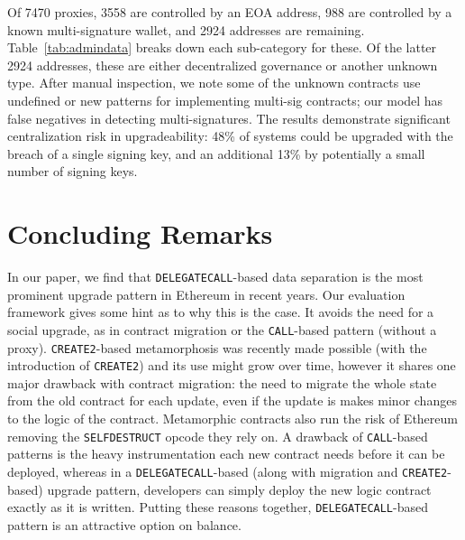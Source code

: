 Of 7470 proxies, 3558 are controlled by an EOA address, 988 are controlled by a known multi-signature wallet, and 2924 addresses are remaining. Table~\ref{tab:admindata} breaks down each sub-category for these. Of the latter 2924 addresses, these are either decentralized governance or another unknown type. After manual inspection, we note some of the unknown contracts use undefined or new patterns for implementing multi-sig contracts; our model has false negatives in detecting multi-signatures. The results demonstrate significant centralization risk in upgradeability: 48\% of systems could be upgraded with the breach of a single signing key, and an additional 13\% by potentially a small number of signing keys.






\section{Concluding Remarks}


In our paper, we find that \texttt{DELEGATECALL}-based data separation is the most prominent upgrade pattern in Ethereum in recent years. Our evaluation framework gives some hint as to why this is the case. It avoids the need for a social upgrade, as in contract migration or the \texttt{CALL}-based pattern (without a proxy). \texttt{CREATE2}-based metamorphosis was recently made possible (with the introduction of \texttt{CREATE2}) and its use might grow over time, however it shares one major drawback with contract migration: the need to migrate the whole state from the old contract for each update, even if the update is makes minor changes to the logic of the contract. Metamorphic contracts also run the risk of Ethereum removing the \texttt{SELFDESTRUCT} opcode they rely on.  A drawback of \texttt{CALL}-based patterns is the heavy instrumentation each new contract needs before it can be deployed, whereas in a \texttt{DELEGATECALL}-based (along with migration and \texttt{CREATE2}-based) upgrade pattern, developers can simply deploy the new logic contract exactly as it is written. Putting these reasons together, \texttt{DELEGATECALL}-based pattern is an attractive option on balance. 

